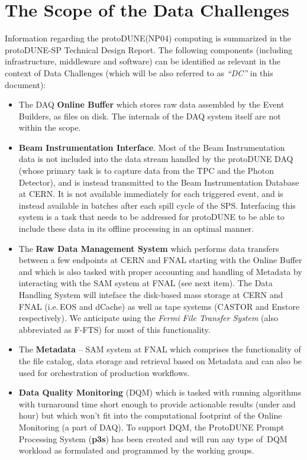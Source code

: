 \documentclass[pdftex,12pt,letter]{article}
\newcommand{\pd}{protoDUNE\xspace}
\begin{document}
\section{The Scope of the Data Challenges}
Information regarding the \pd (NP04) computing is summarized in the \pd-SP Technical Design Report\cite{docdb1794}.
The following components (including infrastructure, middleware and software) can be identified as relevant in the context
of Data Challenges (which will be also referred to as \textit{``DC''} in this document):
\begin{itemize}
\item The DAQ \textbf{Online Buffer} which stores raw data assembled by the Event Builders, as files on disk. The internals
of the DAQ system itself are not within the scope.

\item  \textbf{Beam Instrumentation Interface}. Most of the Beam Instrumentation data is not included into the data stream
handled by the \pd DAQ (whose primary task is to capture data from the TPC and the Photon Detector), and is instead
transmitted to the Beam Instrumentation Database at CERN. It is not available immediately for each triggered event,
and is instead available in batches after each spill cycle of the SPS. Interfacing this system is a task that needs
to be addressed for \pd to be able to include these data in its offline processing in an optimal manner.

\item The \textbf{Raw Data Management System}\cite{docdb1212}  which performs data transfers between a few endpoints
at CERN and FNAL starting with the Online Buffer and which is also tasked with proper accounting and handling of Metadata
by interacting with the SAM system at FNAL (see next item). The Data Handling System will inteface the disk-based mass storage
at CERN and FNAL (i.e.\,EOS\cite{eos} and dCache) as well as tape systems (CASTOR and Enstore respectively).
We anticipate using the \textit{Fermi File Transfer System} (also abbreviated as F-FTS\cite{fts}) for most of this functionality.

\item The \textbf{Metadata}  -- SAM system at FNAL which comprises the functionality of the file catalog, data storage and
retrieval based on Metadata and can also be used for orchestration of production workflows.

\item \textbf{Data Quality Monitoring} (DQM) which is tasked with running algorithms with turnaround time short enough to provide
actionable results (under and hour) but which won't fit into the computational footprint of the Online Monitoring (a part of DAQ).
To support DQM, the ProtoDUNE Prompt Processing System (\textbf{p3s}) \cite{docdb1811,p3s} has been created and will run any type of\
DQM workload as formulated and programmed by the working groups.


\end{itemize}
\end{document}

